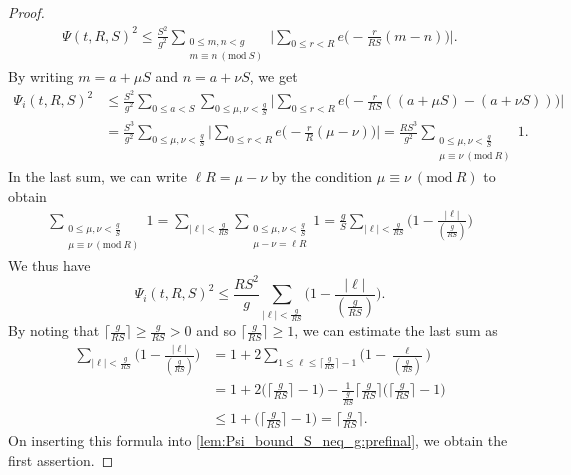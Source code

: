 \documentclass[hidelinks]{amsart}
\numberwithin{equation}{section}
\theoremstyle{plain}
\theoremstyle{definition}
\renewcommand{\mod}[1]{(\mathrm{mod}\ #1)}
\begin{document}
\begin{proof}
\begin{align}
\Psi(t,R,S)^{2}
\le
\frac{S^{2}}{g^{2}}
\sum_{\substack{
0\le m,n<g\\
m\equiv n\ \mod{S}
}}
\biggl|
\sum_{0\le r<R}
e\biggl(-\frac{r}{RS}(m-n)\biggr)
\biggr|.
\end{align}
By writing $m=a+\mu S$ and $n=a+\nu S$, we get
\begin{align}
\Psi_{i}(t,R,S)^{2}
&\le
\frac{S^{2}}{g^{2}}
\sum_{0\le a<S}
\sum_{0\le\mu,\nu<\frac{g}{S}}
\biggl|
\sum_{0\le r<R}
e\biggl(-\frac{r}{RS}((a+\mu S)-(a+\nu S))\biggr)
\biggr|\\
&=
\frac{S^{3}}{g^{2}}
\sum_{0\le\mu,\nu<\frac{g}{S}}
\biggl|
\sum_{0\le r<R}
e\biggl(-\frac{r}{R}(\mu-\nu)\biggr)
\biggr|
=
\frac{RS^{3}}{g^{2}}
\sum_{\substack{
0\le \mu,\nu<\frac{g}{S}\\
\mu\equiv\nu\ \mod{R}
}}
1.
\end{align}
In the last sum,
we can write $\ell R=\mu-\nu$
by the condition $\mu\equiv\nu\ \mod{R}$
to obtain
\begin{align}
\sum_{\substack{
0\le \mu,\nu<\frac{g}{S}\\
\mu\equiv\nu\ \mod{R}
}}
1
=
\sum_{|\ell|<\frac{g}{RS}}
\sum_{\substack{
0\le \mu,\nu<\frac{g}{S}\\
\mu-\nu=\ell R
}}
1
=
\frac{g}{S}
\sum_{|\ell|<\frac{g}{RS}}
\biggl(1-\frac{|\ell|}{(\frac{g}{RS})}\biggr)
\end{align}
We thus have
\begin{equation}
\label{lem:Psi_bound_S_neq_g:prefinal}
\Psi_{i}(t,R,S)^{2}
\le
\frac{RS^{2}}{g}
\sum_{|\ell|<\frac{g}{RS}}
\biggl(1-\frac{|\ell|}{(\frac{g}{RS})}\biggr).
\end{equation}
By noting that $\lceil\frac{g}{RS}\rceil\ge\frac{g}{RS}>0$ and so $\lceil\frac{g}{RS}\rceil\ge1$,
we can estimate the last sum as
\begin{align}
\sum_{|\ell|<\frac{g}{RS}}
\biggl(1-\frac{|\ell|}{(\frac{g}{RS})}\biggr)
&=
1+2\sum_{1\le\ell\le\lceil\frac{g}{RS}\rceil-1}
\biggl(1-\frac{\ell}{(\frac{g}{RS})}\biggr)\\
&=
1+2\biggl(\biggl\lceil\frac{g}{RS}\biggr\rceil-1\biggr)
-
\frac{1}{\frac{g}{RS}}
\biggl\lceil\frac{g}{RS}\biggr\rceil
\biggl(\biggl\lceil\frac{g}{RS}\biggr\rceil-1\biggr)\\
&\le
1+\biggl(\biggl\lceil\frac{g}{RS}\biggr\rceil-1\biggr)
=
\biggl\lceil\frac{g}{RS}\biggr\rceil.
\end{align}
On inserting this formula into \cref{lem:Psi_bound_S_neq_g:prefinal},
we obtain the first assertion.


\end{proof}
\end{document}
